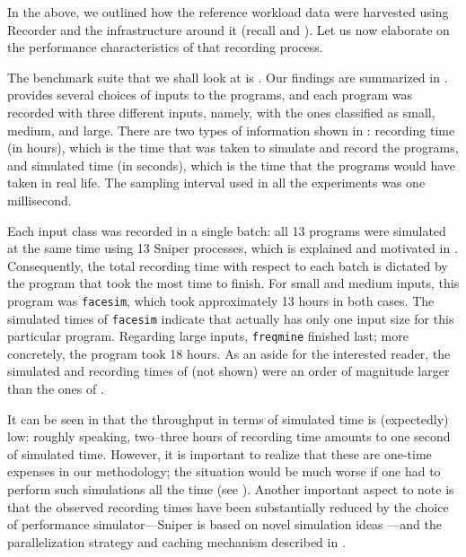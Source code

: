 
In the above, we outlined how the reference workload data were harvested using
Recorder and the infrastructure around it (recall  and
). Let us now elaborate on the performance characteristics of
that recording process.

The benchmark suite that we shall look at is . Our findings are
summarized in .  provides several choices of inputs
to the programs, and each program was recorded with three different inputs,
namely, with the ones classified as small, medium, and large. There are two
types of information shown in : recording time (in hours), which
is the time that was taken to simulate and record the programs, and simulated
time (in seconds), which is the time that the programs would have taken in real
life. The sampling interval used in all the experiments was one millisecond.

Each input class was recorded in a single batch: all 13 programs were simulated
at the same time using 13 Sniper processes, which is explained and motivated in
. Consequently, the total recording time with respect to each
batch is dictated by the program that took the most time to finish. For small
and medium inputs, this program was \texttt{facesim}, which took approximately
13 hours in both cases. The simulated times of \texttt{facesim} indicate that
 actually has only one input size for this particular program.
Regarding large inputs, \texttt{freqmine} finished last; more concretely, the
program took 18 hours. As an aside for the interested reader, the simulated and
recording times of  (not shown) were an order of magnitude
larger than the ones of .

It can be seen in  that the throughput in terms of simulated
time is (expectedly) low: roughly speaking, two--three hours of recording time
amounts to one second of simulated time. However, it is important to realize
that these are one-time expenses in our methodology; the situation would be much
worse if one had to perform such simulations all the time (see ).
Another important aspect to note is that the observed recording times have been
substantially reduced by the choice of performance simulator---Sniper is based
on novel simulation ideas \cite{carlson2011}---and the parallelization strategy
and caching mechanism described in .
